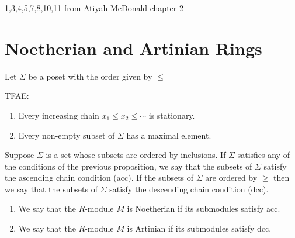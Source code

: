 \documentclass[oneside, 12pt]{scrbook}
\theoremstyle{theorem}
\begin{document}
\begin{exercise}
1,3,4,5,7,8,10,11 from Atiyah McDonald chapter 2
\end{exercise}

\chapter{Noetherian and Artinian Rings}

Let $\Sigma$ be a poset with the order given by $\le $

\begin{proposition}
TFAE: 
\begin{enumerate}
\item Every increasing chain $x_{1} \le x_{2} \le \cdots $ is stationary.
\item Every non-empty subset of $\Sigma$ has a maximal element. 
\end{enumerate}
\end{proposition}

\begin{definition}
Suppose $\Sigma$ is a set whose subsets are ordered by inclusions. If $\Sigma$ satisfies any of the conditions of the previous proposition, we say that the subsets of $\Sigma$ satisfy the ascending chain condition (acc). If the subsets of $\Sigma$ are ordered by $\geq$ then we say that the subsets of $\Sigma$ satisfy the descending chain condition (dcc).
\end{definition}

\begin{definition}
\begin{enumerate}
\item We say that the $R$-module $M$ is Noetherian if its submodules satisfy acc.
\item We say that the $R$-module $M$ is Artinian if its submodules satisfy dcc.
\end{enumerate}
\end{definition}
\end{document}
